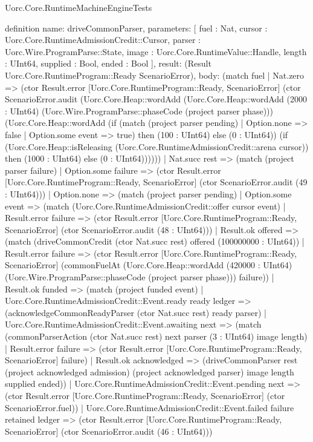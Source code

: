 \begin{lexlean}{Uorc.Core.RuntimeMachineEngineTests}
\begin{semanticmodule}
definition{
  name: driveCommonParser,
  parameters: [
    fuel : Nat,
    cursor : Uorc.Core.RuntimeAdmissionCredit::Cursor,
    parser : Uorc.Wire.ProgramParse::State,
    image : Uorc.Core.RuntimeValue::Handle,
    length : UInt64,
    supplied : Bool,
    ended : Bool
  ],
  result: (Result Uorc.Core.RuntimeProgram::Ready ScenarioError),
  body: (match fuel
    | Nat.zero => (ctor Result.error [Uorc.Core.RuntimeProgram::Ready, ScenarioError] (ctor ScenarioError.audit (Uorc.Core.Heap::wordAdd (Uorc.Core.Heap::wordAdd (2000 : UInt64) (Uorc.Wire.ProgramParse::phaseCode (project parser phase))) (Uorc.Core.Heap::wordAdd (if (match (project parser pending)
      | Option.none => false
      | Option.some event => true) then (100 : UInt64) else (0 : UInt64)) (if (Uorc.Core.Heap::isReleasing (Uorc.Core.RuntimeAdmissionCredit::arena cursor)) then (1000 : UInt64) else (0 : UInt64))))))
    | Nat.succ rest => (match (project parser failure)
      | Option.some failure => (ctor Result.error [Uorc.Core.RuntimeProgram::Ready, ScenarioError] (ctor ScenarioError.audit (49 : UInt64)))
      | Option.none => (match (project parser pending)
        | Option.some event => (match (Uorc.Core.RuntimeAdmissionCredit::offer cursor event)
          | Result.error failure => (ctor Result.error [Uorc.Core.RuntimeProgram::Ready, ScenarioError] (ctor ScenarioError.audit (48 : UInt64)))
          | Result.ok offered => (match (driveCommonCredit (ctor Nat.succ rest) offered (100000000 : UInt64))
            | Result.error failure => (ctor Result.error [Uorc.Core.RuntimeProgram::Ready, ScenarioError] (commonFuelAt (Uorc.Core.Heap::wordAdd (420000 : UInt64) (Uorc.Wire.ProgramParse::phaseCode (project parser phase))) failure))
            | Result.ok funded => (match (project funded event)
              | Uorc.Core.RuntimeAdmissionCredit::Event.ready ready ledger => (acknowledgeCommonReadyParser (ctor Nat.succ rest) ready parser)
              | Uorc.Core.RuntimeAdmissionCredit::Event.awaiting next => (match (commonParserAction (ctor Nat.succ rest) next parser (3 : UInt64) image length)
                | Result.error failure => (ctor Result.error [Uorc.Core.RuntimeProgram::Ready, ScenarioError] failure)
                | Result.ok acknowledged => (driveCommonParser rest (project acknowledged admission) (project acknowledged parser) image length supplied ended))
              | Uorc.Core.RuntimeAdmissionCredit::Event.pending next => (ctor Result.error [Uorc.Core.RuntimeProgram::Ready, ScenarioError] (ctor ScenarioError.fuel))
              | Uorc.Core.RuntimeAdmissionCredit::Event.failed failure retained ledger => (ctor Result.error [Uorc.Core.RuntimeProgram::Ready, ScenarioError] (ctor ScenarioError.audit (46 : UInt64)))
}
\end{semanticmodule}
\end{lexlean}
